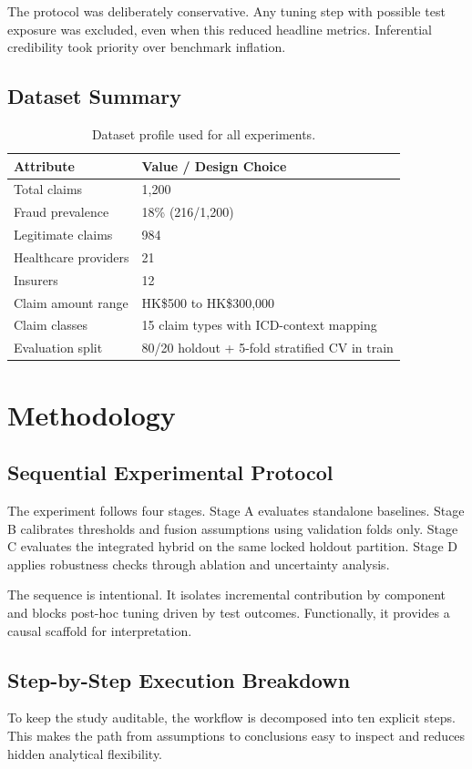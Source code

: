 \documentclass[12pt,a4paper]{report}
\begin{document}
The protocol was deliberately conservative. Any tuning step with possible test exposure was excluded, even when this reduced headline metrics. Inferential credibility took priority over benchmark inflation.

\section{Dataset Summary}
\begin{table}[H]
\caption{Dataset profile used for all experiments.}
\label{tab:dataset}
\begin{tabular}{p{}p{}}
\toprule
\textbf{Attribute} & \textbf{Value / Design Choice} \\
\midrule
Total claims & 1,200 \\
Fraud prevalence & 18\% (216/1,200) \\
Legitimate claims & 984 \\
Healthcare providers & 21 \\
Insurers & 12 \\
Claim amount range & HK\$500 to HK\$300,000 \\
Claim classes & 15 claim types with ICD-context mapping \\
Evaluation split & 80/20 holdout + 5-fold stratified CV in train \\
\bottomrule
\end{tabular}
\end{table}

\chapter{Methodology}

\section{Sequential Experimental Protocol}
The experiment follows four stages. Stage A evaluates standalone baselines. Stage B calibrates thresholds and fusion assumptions using validation folds only. Stage C evaluates the integrated hybrid on the same locked holdout partition. Stage D applies robustness checks through ablation and uncertainty analysis.

The sequence is intentional. It isolates incremental contribution by component and blocks post-hoc tuning driven by test outcomes. Functionally, it provides a causal scaffold for interpretation.

\section{Step-by-Step Execution Breakdown}
To keep the study auditable, the workflow is decomposed into ten explicit steps. This makes the path from assumptions to conclusions easy to inspect and reduces hidden analytical flexibility.
\end{document}
